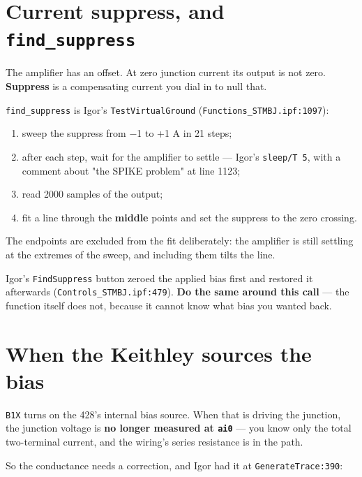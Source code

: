 \section{Current suppress, and \texttt{find\_\discretionary{}{}{}suppress}}

The amplifier has an offset. At zero junction current its output is not zero. \textbf{Suppress} is a compensating current you dial in to null that.

\texttt{find\_\discretionary{}{}{}suppress} is Igor's \texttt{Test\discretionary{}{}{}Virtual\discretionary{}{}{}Ground} (\texttt{Functions\_\discretionary{}{}{}STMBJ.\discretionary{}{}{}ipf:1097}):

\begin{enumerate}[leftmargin=*]
\item sweep the suppress from −1 to +1 \textmu{}A in 21 steps;
\item after each step, wait for the amplifier to settle --- Igor's \texttt{sleep/\discretionary{}{}{}T 5}, with a comment about "the SPIKE problem" at line 1123;
\item read 2000 samples of the output;
\item fit a line through the \textbf{middle} points and set the suppress to the zero crossing.
\end{enumerate}

The endpoints are excluded from the fit deliberately: the amplifier is still settling at the extremes of the sweep, and including them tilts the line.

Igor's \texttt{Find\discretionary{}{}{}Suppress} button zeroed the applied bias first and restored it afterwards (\texttt{Controls\_\discretionary{}{}{}STMBJ.\discretionary{}{}{}ipf:479}). \textbf{Do the same around this call} --- the function itself does not, because it cannot know what bias you wanted back.

\section{When the Keithley sources the bias}

\texttt{B1X} turns on the 428's internal bias source. When that is driving the junction, the junction voltage is \textbf{no longer measured at \texttt{ai0}} --- you know only the total two-terminal current, and the wiring's series resistance is in the path.

So the conductance needs a correction, and Igor had it at \texttt{Generate\discretionary{}{}{}Trace:390}:

